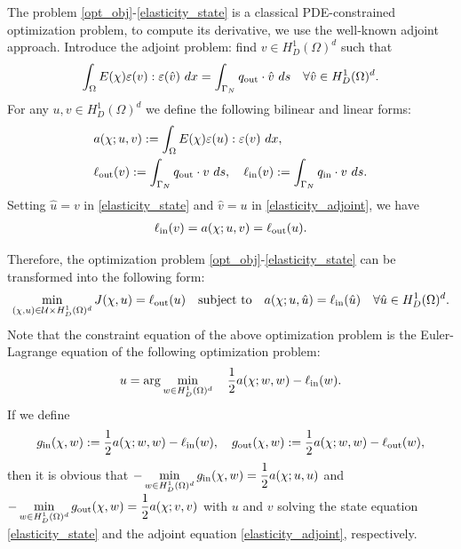 \documentclass{amsart}
\begin{document}
The problem \eqref{opt_obj}-\eqref{elasticity_state} is a classical PDE-constrained optimization problem, to compute its derivative, we use the well-known adjoint approach.  Introduce the adjoint problem: find $v\in H_D^1(\Omega)^d$ such that
\begin{equation}\label{elasticity_adjoint}
    \int_{\Omega}E(\chi)\varepsilon(v):\varepsilon(\hat{v})\ dx=\int_{\Gamma_N}q_{\rm out}\cdot \hat{v}\ ds\quad \forall \hat{v}\in H_D^1(\Omega)^d.
\end{equation}
For any $u,v\in H_D^1(\Omega)^d$ we define the following bilinear and linear forms:
\begin{align}
    &a(\chi;u,v): = \int_{\Omega}E(\chi)\varepsilon(u):\varepsilon(v)\ dx,\\
    &\ell_{\rm out}({v}): = \int_{\Gamma_N}q_{\rm out}\cdot {v}\ ds,\quad \ell_{\rm in}({v}): = \int_{\Gamma_N}q_{\rm in}\cdot {v}\ ds.
\end{align}
Setting $\hat u=v$ in \eqref{elasticity_state} and $\hat v=u$ in \eqref{elasticity_adjoint}, we have
\begin{eqnarray}
\ell_{\rm in}(v)=a(\chi;u,v)=\ell_{\rm out}(u). \label{equivalence}   
\end{eqnarray}

Therefore, the optimization problem \eqref{opt_obj}-\eqref{elasticity_state} can be transformed into the following form:
\begin{equation}\label{orign_problem}
    \min_{(\chi,u)\in \mathcal{U}\times H_D^1(\Omega)^d}J(\chi,u)=\ell_{\rm out}(u)\quad \mbox{subject\ to}\quad a(\chi;u,\hat{u})=\ell_{\rm in}(\hat{u})\quad\forall\hat{u}\in H_D^1(\Omega)^d.
\end{equation}
Note that the constraint equation of the above optimization problem is the Euler-Lagrange equation of the following optimization problem:
\begin{eqnarray}
 u=\arg\min\limits_{w\in H_D^1(\Omega)^d} \quad   \dfrac{1}{2}a(\chi;w,w)-\ell_{\rm in}(w).\nonumber 
\end{eqnarray}
If we define 
\begin{align*}
    g_{\rm in}(\chi,w):=\dfrac{1}{2}a(\chi;w,w)-\ell_{\rm in}(w),\quad 
    g_{\rm out}(\chi,w):=\dfrac{1}{2}a(\chi;w,w)-\ell_{\rm out}(w),
\end{align*}
then it is obvious that $ -\min\limits_{w\in H_D^1(\Omega)^d}g_{\rm in}(\chi,w) = \dfrac{1}{2}a(\chi;u,u)$ and $ -\min\limits_{w\in H_D^1(\Omega)^d}g_{\rm out}(\chi,w) = \dfrac{1}{2}a(\chi;v,v)$ with $u$ and $v$ solving the state equation \eqref{elasticity_state} and the adjoint equation \eqref{elasticity_adjoint}, respectively. 
\end{document}
